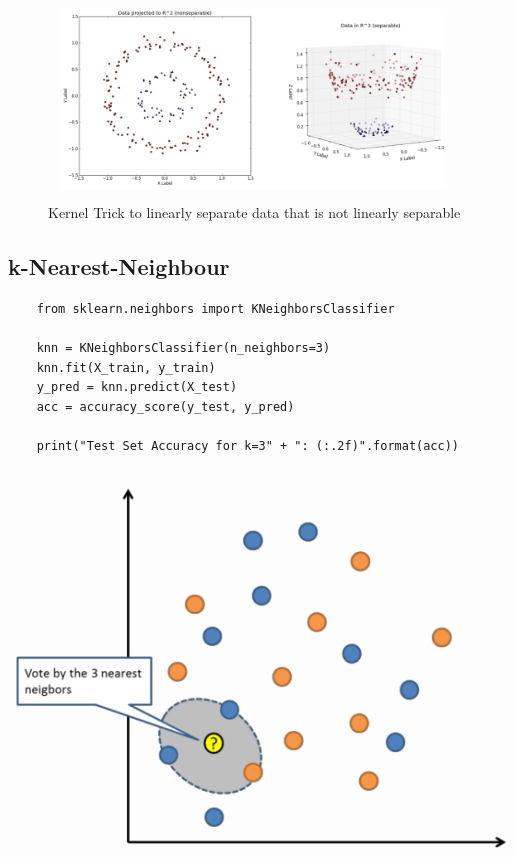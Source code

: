 \documentclass[11pt]{article}
\begin{document}
\begin{figure}[htb!]
    \centering
    \includegraphics[keepaspectratio=true,height=11\baselineskip]{kernel_trick.png}
    \caption{Kernel Trick to linearly separate data that is not linearly separable}
    \label{fig:kernel_trick}
\end{figure}

\subsection{k-Nearest-Neighbour}

\begin{minipage}{0.55\textwidth}
    \begin{lstlisting}
    from sklearn.neighbors import KNeighborsClassifier

    knn = KNeighborsClassifier(n_neighbors=3)
    knn.fit(X_train, y_train)
    y_pred = knn.predict(X_test)
    acc = accuracy_score(y_test, y_pred)

    print("Test Set Accuracy for k=3" + ": (:.2f)".format(acc))
    \end{lstlisting}
\end{minipage}\hfill
\begin{minipage}{0.40\textwidth}
    \centering
    \includegraphics[keepaspectratio=true, width=\textwidth]{knn.png}
\end{minipage}
\end{document}
